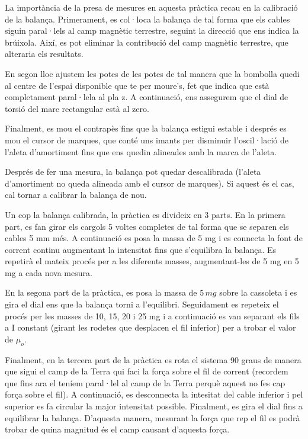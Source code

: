 \documentclass[11pt]{article}
\numberwithin{equation}{section}
\numberwithin{figure}{section}
\numberwithin{table}{section}
\begin{document}
La importància de la presa de mesures en aquesta pràctica recau en la calibració de la balança. Primerament, es col·loca la balança de tal forma que els cables siguin paral·lels al camp magnètic terrestre, seguint la direcció que ens indica la brúixola. Així, es pot eliminar la contribució del camp
magnètic terrestre, que alteraria els resultats. 

En segon lloc ajustem les potes de les potes de tal manera que la bombolla quedi al centre de l'espai disponible que te per moure's, fet que indica que està completament paral·lela al pla z. A continuació, ens assegurem que el dial de torsió del marc rectangular està al zero. 

Finalment, es mou el contrapès fins que la balança estigui estable i després es mou el cursor de marques, que conté uns imants per disminuir l'oscil·lació de l'aleta d'amortiment fins que ens quedin alineades amb la marca de l'aleta.

Després de fer una mesura, la balança pot quedar descalibrada (l'aleta d'amortiment no queda alineada amb el cursor de marques). Si aquest és el cas, cal tornar a calibrar la balança de nou.

Un cop la balança calibrada, la pràctica es divideix en 3 parts. En la primera part, es fan girar els cargols 5 voltes completes de tal forma que se separen els cables 5 mm més. A continuació es posa la massa de 5 mg i es connecta la font de corrent continu augmentant la intensitat fins que
s'equilibra la balança. Es repetirà el mateix procés per a les diferents masses, augmentant-les de 5 mg en 5 mg a cada nova mesura.

En la segona part de la pràctica, es posa la massa de $5 \, mg$ sobre la cassoleta i es gira el dial ens que la balança torni a l'equilibri. Seguidament es repeteix el procés per les masses de 10, 15, 20 i 25 mg i a continuació es van separant els fils a I constant (girant les rodetes que desplacen el fil inferior) per a trobar el valor de $\mu_o$.

Finalment, en la tercera part de la pràctica es rota el sistema 90 graus de manera que sigui el camp de la Terra qui faci la força sobre el fil de corrent (recordem que fins ara el teníem paral·lel al camp de la Terra perquè aquest no fes cap força sobre el fil). A continuació, es desconnecta la intesitat del cable inferior i pel superior es fa circular la major intensitat possible. Finalment, es gira el dial fins a equilibrar la balança. D’aquesta manera, mesurant la força que rep el fil es podrà trobar de quina magnitud és el camp causant d’aquesta força.
\end{document}
